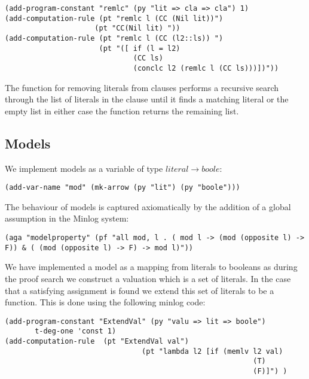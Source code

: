 \begin{lstlisting}[caption = "The Function Which Removes a Literal From a Clause"]
(add-program-constant "remlc" (py "lit => cla => cla") 1)
(add-computation-rule (pt "remlc l (CC (Nil lit))") 
                     (pt "CC(Nil lit) "))
(add-computation-rule (pt "remlc l (CC (l2::ls)) ")
                      (pt "([ if (l = l2)                                       
                              (CC ls)                                           
                              (conclc l2 (remlc l (CC ls)))])"))
\end{lstlisting}

The function for removing literals from clauses performs a recursive search through the list of literals in the clause until it finds a matching literal or the empty list in either case the function returns the remaining list.






\subsection*{Models}
We implement models as a variable of type $literal \to boole$:
\begin{center}
\texttt{(add-var-name "mod" (mk-arrow (py "lit") (py "boole")))}
\end{center}
The behaviour of models is captured axiomatically by the addition of a global assumption in the Minlog system:
\begin{center}
\texttt{(aga "modelproperty" (pf "all mod, l . ( mod l  -> (mod (opposite l) -> F)) \& ( (mod (opposite l) -> F) -> mod l)"))}
\end{center}
We have implemented a model as a mapping from literals to booleans as during the proof search we construct a valuation which is a set of literals. In the case that a satisfying assignment is found we extend this set of literals to be a function. This is done using the following minlog code:

\begin{lstlisting}[caption = "The ExtendVal function in Minlog"]
(add-program-constant "ExtendVal" (py "valu => lit => boole") 
       t-deg-one 'const 1)
(add-computation-rule  (pt "ExtendVal val")  
                                (pt "lambda l2 [if (memlv l2 val)                                                                                                       
                                                          (T)                                                                                                                        
                                                          (F)]") )
\end{lstlisting}



